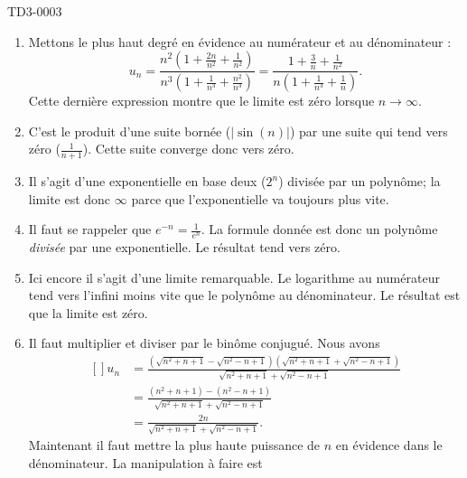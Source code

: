 
\begin{corrige}{TD3-0003}

	\begin{enumerate}
		\item
			Mettons le plus haut degré en évidence au numérateur et au dénominateur :
			\begin{equation}
				u_n=\frac{ n^2\left( 1+\frac{ 2n }{ n^2 }+\frac{ 1 }{ n^2 } \right) }{ n^3\left( 1+\frac{ 1 }{ n^3 }+\frac{ n^2 }{ n^3 } \right) }=\frac{ 1+\frac{ 3 }{ n }+\frac{1}{ n^2 } }{ n\left( 1+\frac{1}{ n^3 }+\frac{1}{ n } \right) }.
			\end{equation}
			Cette dernière expression montre que le limite est zéro lorsque $n\to \infty$.
		\item
			C'est le produit d'une suite bornée ($|\sin(n)|$) par une suite qui tend vers zéro ($\frac{1}{ n+1 }$). Cette suite converge donc vers zéro.
		\item
			Il s'agit d'une exponentielle en base deux ($2^n$) divisée par un polynôme; la limite est donc $\infty$ parce que l'exponentielle va toujours plus vite.
		\item
			Il faut se rappeler que $ e^{-n}=\frac{1}{  e^{n} }$. La formule donnée est donc un polynôme \emph{divisée} par une exponentielle. Le résultat tend vers zéro.
		\item
			Ici encore il s'agit d'une limite remarquable. Le logarithme au numérateur tend vers l'infini moins vite que le polynôme au dénominateur. Le résultat est que la limite est zéro.
		\item
			Il faut multiplier et diviser par le binôme conjugué. Nous avons
			\begin{equation}
				\begin{aligned}[]
						u_n&=\frac{ \left( \sqrt{n^2+n+1}-\sqrt{n^2-n+1} \right)\left( \sqrt{n^2+n+1}+\sqrt{n^2-n+1} \right) }{  \sqrt{n^2+n+1}+\sqrt{n^2-n+1}  }\\
						&=\frac{ (n^2+n+1)-(n^2-n+1) }{    \sqrt{n^2+n+1}+\sqrt{n^2-n+1}  }\\
						&=\frac{ 2n }{   \sqrt{n^2+n+1}+\sqrt{n^2-n+1}   }.
				\end{aligned}
			\end{equation}
			Maintenant il faut mettre la plus haute puissance de $n$ en évidence dans le dénominateur. La manipulation à faire est

\end{enumerate}
\end{corrige}
